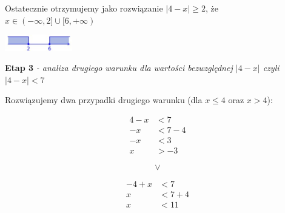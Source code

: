 \documentclass[12pt, a4paper]{report}
\begin{document}
    \noindent
    Ostatecznie otrzymujemy jako rozwiązanie $|4 - x| \geq 2$, że $x \in (-\infty, 2] \cup [6, +\infty)$

    \begin{center}
        \includegraphics[width=0.22\textwidth]{fig_4.jpg}
    \end{center}

    \vspace{15pt}                            %

    \noindent
    \textbf{Etap 3}
    \emph{ - analiza drugiego warunku dla wartości bezwzględnej $|4-x|$ czyli $|4 - x| < 7$}

    \noindent
    Rozwiązujemy dwa przypadki drugiego warunku (dla $x \leq 4$ oraz $x > 4$):

    \noindent

    \noindent
    \begin{center}
        \begin{minipage}{0.2\textwidth}
            \begin{align*}
                4 - x &< 7 \\
                -x &< 7 - 4 \\
                -x &< 3 \\
                x &> -3
            \end{align*}
        \end{minipage}
        \hspace{0.05\textwidth}
        \begin{minipage}{0.04\textwidth}
            \[
                \vee
            \]
        \end{minipage}
        \hspace{0.05\textwidth}
        \begin{minipage}{0.2\textwidth}
            \begin{align*}
                -4 + x &< 7 \\
                x &< 7 + 4 \\
                x &< 11
            \end{align*}
        \end{minipage}
    \end{center}
\end{document}
